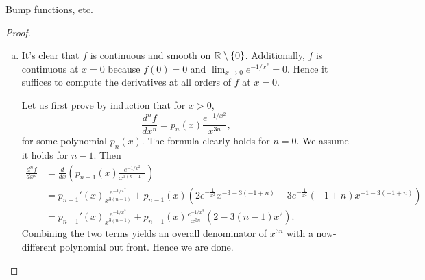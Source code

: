 \documentclass{../../mathnotes}
\begin{document}
\begin{prop}
    Bump functions, etc.
\end{prop}
\begin{proof}
    \begin{enumerate}[(a)]
        \item It's clear that $f$ is continuous and smooth on $\mathbb{R}\setminus\{0\}$. Additionally, $f$ is continuous at $x=0$
            because $f(0)=0$ and $\lim_{x\to 0}e^{-1/x^2}=0$. Hence it suffices to compute the derivatives at all orders of $f$ at $x=0$.
            
            Let us first prove by induction that for $x>0$,
            \[\frac{d^nf}{dx^n}=p_n(x)\frac{e^{-1/x^2}}{x^{3n}},\]
            for some polynomial $p_n(x)$. The formula clearly holds for $n=0$. We assume it holds for $n-1$. Then
            \begin{align*}
                \frac{d^nf}{dx^n}&=\frac{d}{dx}\left( p_{n-1}(x)\frac{e^{-1/x^2}}{x^{3(n-1)}} \right)\\
                &=p_{n-1}'(x)\frac{e^{-1/x^2}}{x^{3(n-1)}}+p_{n-1}(x)\left( 2 e^{-\frac{1}{x^2}} x^{-3-3 (-1+n)}-3 e^{-\frac{1}{x^2}} (-1+n) x^{-1-3 (-1+n)} \right)\\
                &=p_{n-1}'(x)\frac{e^{-1/x^2}}{x^{3(n-1)}}+p_{n-1}(x)\frac{e^{-1/x^2}}{x^{3n}}\left( 2-3(n-1)x^2 \right).
            \end{align*}
            Combining the two terms yields an overall denominator of $x^{3n}$ with a now-different polynomial out front. Hence we are done.


\end{enumerate}
\end{proof}
\end{document}
